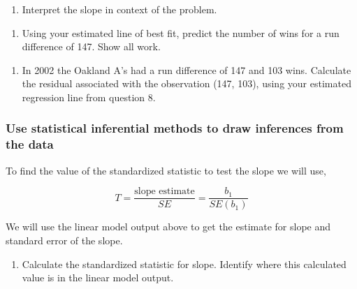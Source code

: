 \documentclass[
]{report}
\providecommand{\tightlist}{%
  \setlength{\itemsep}{0pt}\setlength{\parskip}{0pt}}
\begin{document}
\vspace{1in}

\begin{enumerate}
\def\labelenumi{\arabic{enumi}.}
\setcounter{enumi}{8}
\tightlist
\item
  Interpret the slope in context of the problem.
\end{enumerate}

\vspace{1in}

\begin{enumerate}
\def\labelenumi{\arabic{enumi}.}
\setcounter{enumi}{9}
\tightlist
\item
  Using your estimated line of best fit, predict the number of wins for a run difference of 147. Show all work.
\end{enumerate}

\vspace{1in}

\begin{enumerate}
\def\labelenumi{\arabic{enumi}.}
\setcounter{enumi}{10}
\tightlist
\item
  In 2002 the Oakland A's had a run difference of 147 and 103 wins. Calculate the residual associated with the observation (147, 103), using your estimated regression line from question 8.
\end{enumerate}

\vspace{1in}

\hypertarget{use-statistical-inferential-methods-to-draw-inferences-from-the-data-2}{%
\subsubsection*{Use statistical inferential methods to draw inferences from the data}\label{use-statistical-inferential-methods-to-draw-inferences-from-the-data-2}}

To find the value of the standardized statistic to test the slope we will use,

\[
T = \frac{\mbox{slope estimate}}{SE} = \frac{b_1}{SE(b_1)}
\]

We will use the linear model output above to get the estimate for slope and standard error of the slope.

\begin{enumerate}
\def\labelenumi{\arabic{enumi}.}
\setcounter{enumi}{11}
\tightlist
\item
  Calculate the standardized statistic for slope. Identify where this calculated value is in the linear model output.
\end{enumerate}
\end{document}
